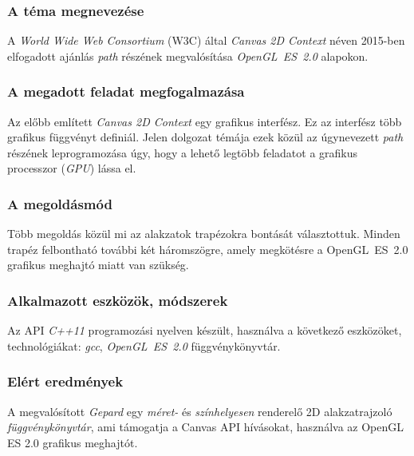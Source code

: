 \documentclass[12pt]{report}
\theoremstyle{definition}
\begin{document}

    \subsubsection*{A téma megnevezése}

A \emph{World Wide Web Consortium} (W3C) által \emph{Canvas 2D Context} néven
2015-ben elfogadott ajánlás \emph{path} részének megvalósítása
\emph{OpenGL~ES~2.0} alapokon.

    \subsubsection*{A megadott feladat megfogalmazása}

Az előbb említett \emph{Canvas 2D Context} egy grafikus interfész. Ez az
interfész több grafikus függvényt definiál. Jelen dolgozat témája ezek közül az
úgynevezett \emph{path} részének leprogramozása úgy, hogy a lehető legtöbb
feladatot a grafikus processzor (\textit{GPU}) lássa el.

    \subsubsection*{A megoldásmód}

Több megoldás közül mi az alakzatok trapézokra bontását választottuk. Minden
trapéz felbontható további két háromszögre, amely megkötésre a OpenGL~ES~2.0
grafikus meghajtó miatt van szükség.

    \subsubsection*{Alkalmazott eszközök, módszerek}

Az API \emph{C++11} programozási nyelven készült, használva a következő
eszközöket, technológiákat: \emph{gcc}, \textit{OpenGL~ES~2.0} függvénykönyvtár.

    \subsubsection*{Elért eredmények}
A megvalósított \emph{Gepard} egy \emph{méret-} és \emph{színhelyesen}
renderelő 2D alakzatrajzoló \emph{függvénykönyvtár}, ami támogatja a Canvas API
hívásokat, használva az OpenGL ES 2.0 grafikus meghajtót.
\end{document}
